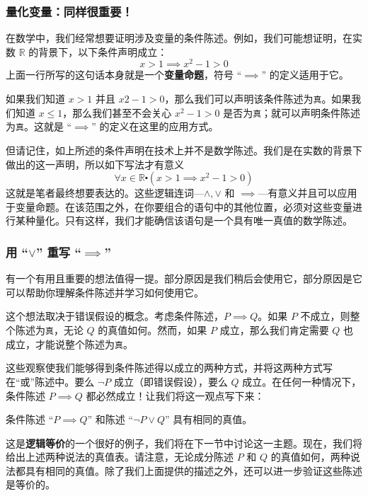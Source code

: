\subsubsection*{量化变量：同样很重要！}

在数学中，我们经常想要证明涉及变量的条件陈述。例如，我们可能想证明，在实数 $\mathbb{R}$ 的背景下，以下条件声明成立：
\[x > 1 \implies x^2 - 1 > 0\]
上面一行所写的这句话本身就是一个\textbf{变量命题}，符号 ``$\implies$'' 的定义适用于它。

如果我们知道 $x > 1$ 并且 $x2 - 1 > 0$，那么我们可以声明该条件陈述为\verb|真|。如果我们知道 $x \le 1$，那么我们甚至不会关心 $x^2 - 1 > 0$ 是否为\verb|真|；就可以声明条件陈述为\verb|真|。这就是 ``$\implies$'' 的定义在这里的应用方式。

但请记住，如上所述的条件声明在技术上并不是数学陈述。我们是在实数的背景下做出的这一声明，所以如下写法才有意义
\[\forall x \in \mathbb{R} \centerdot (x > 1 \implies x^2 - 1 > 0)\]
这就是笔者最终想要表达的。这些逻辑连词---$\land , \lor$ 和 $\implies$---有意义并且可以应用于变量命题。在该范围之外，在你要组合的语句中的其他位置，必须对这些变量进行某种量化。只有这样，我们才能确信该语句是一个具有唯一真值的数学陈述。

\subsubsection*{用 ``$\lor$'' 重写 ``$\implies$''}

有一个有用且重要的想法值得一提。部分原因是我们稍后会使用它，部分原因是它可以帮助你理解条件陈述并学习如何使用它。

这个想法取决于错误假设的概念。考虑条件陈述，$P \implies Q$。如果 $P$ 不成立，则整个陈述为\verb|真|，无论 $Q$ 的真值如何。然而，如果 $P$ 成立，那么我们肯定需要 $Q$ 也成立，才能说整个陈述为\verb|真|。

这些观察使我们能够得到条件陈述得以成立的两种方式，并将这两种方式写在``或''陈述中。要么 $\neg P$ 成立（即错误假设），要么 $Q$ 成立。在任何一种情况下，条件陈述 $P \implies Q$ 都必然成立！让我们将这一观点写下来：

\begin{center}
    条件陈述 ``$P \implies Q$'' 和陈述 ``$\neg P \lor Q$'' 具有相同的真值。
\end{center}

这是\textbf{逻辑等价}的一个很好的例子，我们将在下一节中讨论这一主题。现在，我们将给出上述两种说法的真值表。请注意，无论成分陈述 $P$ 和 $Q$ 的真值如何，两种说法都具有相同的真值。除了我们上面提供的描述之外，还可以进一步验证这些陈述是等价的。

